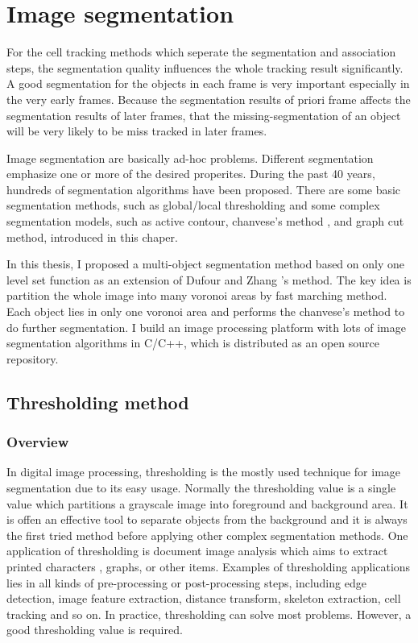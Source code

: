 \chapter{Image segmentation}
For the cell tracking methods which seperate the segmentation and association steps, the segmentation quality influences the whole tracking result significantly. A good segmentation for the objects in each frame is very important especially in the very early frames. Because the segmentation results of priori frame affects the segmentation results of later frames, that the missing-segmentation of an object will be very likely to be miss tracked in later frames.

Image segmentation are basically ad-hoc problems. Different segmentation emphasize one or more of the desired properites. During the past 40 years, hundreds of segmentation algorithms have been proposed\cite{freixenet2002yet}. There are some basic segmentation methods, such as global/local thresholding and some complex segmentation models, such as active contour, chanvese's method , and graph cut method, introduced in this chaper.

In this thesis, I proposed a multi-object segmentation method based on only one level set function as an extension of Dufour \cite{dufour} and Zhang \cite{zhang}'s method. The key idea is partition the whole image into many voronoi areas by fast marching method. Each object lies in only one voronoi area and performs the chanvese's method to do further segmentation. I build an image processing platform with lots of image segmentation algorithms in C/C++, which is distributed as an open source repository.
\section{Thresholding method}
\subsection{Overview}
In digital image processing, thresholding is the mostly used technique for image segmentation due to its easy usage. Normally the thresholding value is a single value which partitions a grayscale image into foreground and background area. It is offen an effective tool to separate objects from the background and it is always the first tried method before applying other complex segmentation methods. One application of thresholding is document image analysis which aims to extract printed characters \cite{kamel1993extraction,abak1997performance}, graphs, or other items. Examples of thresholding applications lies in all kinds of pre-processing or post-processing steps, including edge detection, image feature extraction, distance transform, skeleton extraction, cell tracking and so on. In practice, thresholding can solve most problems. However, a good thresholding value is required.

